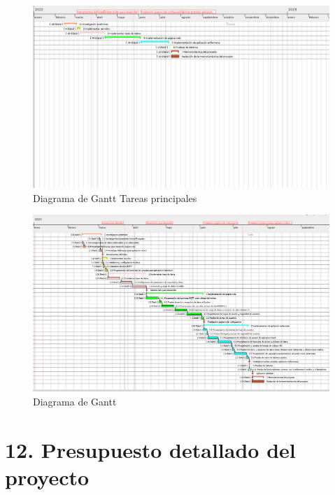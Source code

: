 \documentclass[
11pt, %
]{charter}
\begin{document}
\begin{landscape}
\begin{figure}[htpb]
\centering 
\includegraphics[height=.85\textheight]{./Figuras/Tareas-reducida.png}
\caption{Diagrama de Gantt Tareas principales}
\label{fig:diagGantt}
\end{figure}
\end{landscape}


\newpage
\begin{landscape}
\begin{figure}[htpb]
\centering 
\includegraphics[height=.85\textheight]{./Figuras/tareas.png}
\caption{Diagrama de Gantt}
\label{fig:diagGantt2}
\end{figure}

\end{landscape}

\section{12. Presupuesto detallado del proyecto}
\label{sec:presupuesto}
\end{document}
